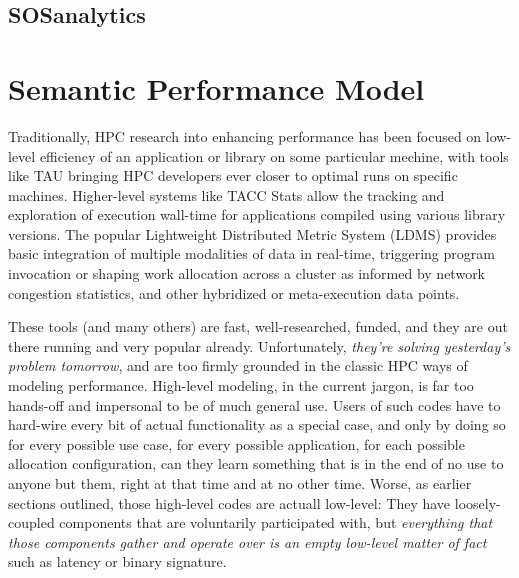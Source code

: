 \subsection{SOSanalytics}





\section{Semantic Performance Model}

Traditionally, HPC research into enhancing performance has been
focused on low-level efficiency of an application or library on some
particular mechine, with tools like TAU bringing HPC developers ever
closer to optimal runs on specific machines.  Higher-level systems
like TACC Stats \cite{evans2014comprehensive} allow the tracking and
exploration of execution wall-time for applications compiled using
various library versions.  The popular Lightweight Distributed Metric
System (LDMS) \cite{agelastos2014lightweight} provides basic
integration of multiple modalities of data in real-time, triggering
program invocation or shaping work allocation across a cluster as
informed by network congestion statistics, and other hybridized or
meta-execution data points.

These tools (and many others) are fast, well-researched, funded, and
they are out there running and very popular already. Unfortunately,
\textit{they're solving yesterday's problem tomorrow}, and are too
firmly grounded in the classic HPC ways of modeling
performance. High-level modeling, in the current jargon, is far too
hands-off and impersonal to be of much general use. Users of such
codes have to hard-wire every bit of actual functionality as a special
case, and only by doing so for every possible use case, for every
possible application, for each possible allocation configuration, can
they learn something that is in the end of no use to anyone but them,
right at that time and at no other time. Worse, as earlier sections
outlined, those high-level codes are actuall low-level: They have
loosely-coupled components that are voluntarily participated with,
but \textit{everything that those components gather and operate over
is an empty low-level matter of fact} such as latency or binary signature.

